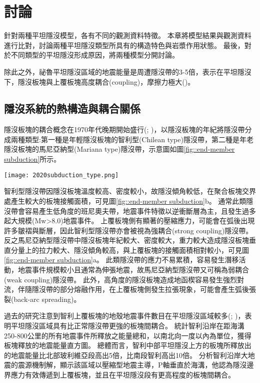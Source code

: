 
\chapter{討論}

針對兩種平坦隱沒模型，各有不同的觀測資料特徵。
本章將模型結果與觀測資料進行比對，討論兩種平坦隱沒類型所具有的構造特色與岩漿作用狀態。
最後，對於不同類型的平坦隱沒形成原因，將兩種模型分開討論。

除此之外，祕魯平坦隱沒區域的地震能量是周遭隱沒帶的3-5倍，表示在平坦隱沒下，隱沒板塊與上覆板塊高度耦合(coupling)，摩擦力極大(\citealp{Gutscher2000A})。

\section{隱沒系統的熱構造與耦合關係}
隱沒板塊的耦合概念在1970年代晚期開始盛行(\citealp{uyeda1979back}; \citealp{ruff1980seismicity})，\citealp{uyeda1979back}以隱沒板塊的年紀將隱沒帶分成兩種類型:第一種是年輕隱沒板塊的智利型(Chilean type)隱沒帶，第二種是年老隱沒板塊的馬尼亞納型(Mariana type)隱沒帶，示意圖如圖\ref{fig::end-member subduction}所示。
\begin{figure*}[htp]
    \centering
    \texttt{[image: 2020subduction\_type.png]}
    \caption[隱沒帶的兩種型態示意圖]{隱沒帶的兩種型態示意圖，摘自\citealp{Yan2020}。}
    \label{fig::end-member subduction}
\end{figure*}

智利型隱沒帶因隱沒板塊溫度較高、密度較小，故隱沒傾角較低，在聚合板塊交界處產生較大的板塊接觸面積，可見圖\ref{fig::end-member subduction}b。
通常此類隱沒帶會容易產生低角度的班尼奧夫帶，地震事件特徵以逆衝斷層為主，且發生過多起大規模(Mw>8.0)地震事件。
上覆板塊側有顯著的壓縮應力，可能會在弧後出現許多皺褶與斷層，因此智利型隱沒帶亦會被視為強耦合(strong coupling)隱沒帶。
反之馬尼亞納型隱沒帶中隱沒板塊年紀較大、密度較大，重力較大造成隱沒板塊垂直分量上的拉力較大、隱沒傾角較高，與上覆板塊的接觸面積相對較小，可見圖\ref{fig::end-member subduction}a。
此類隱沒帶的應力不易累積，容易發生潛移活動，地震事件規模較小且通常為伸張地震，故馬尼亞納型隱沒帶又可稱為弱耦合(weak coupling)隱沒帶。
此外，高角度的隱沒板塊造成地函楔容易發生強烈對流，伴隨隱沒帶的部分熔融作用，在上覆板塊側發生拉張現象，可能會產生弧後張裂(back-arc spreading)。

過去的研究注意到智利上覆板塊的地殼地震事件數目在平坦隱沒區域較多(\citealp{jordan1983andean}; \citealp{smalley1993basement})，表明平坦隱沒區域具有比正常隱沒帶更強的板塊間耦合。
\citealp{gutscher2002andean}統計智利沿岸在距海溝250-800公里的所有地震事件所釋放之能量總和，以南北向一度以內為單位，獲得板塊釋放的地震能量直方圖。
總體而言，智利中部平坦隱沒上方的板塊所釋放出的地震能量比北部玻利維亞段高出5倍，比南段智利高出10倍。
\citealp{jordan1983andean}分析智利沿岸大地震的震源機制解，顯示該區域以壓縮型地震主導，P軸垂直於海溝，他認為隱沒邊界應力有效傳遞到上覆板塊，並且在平坦隱沒段有更高程度的板塊間耦合。

